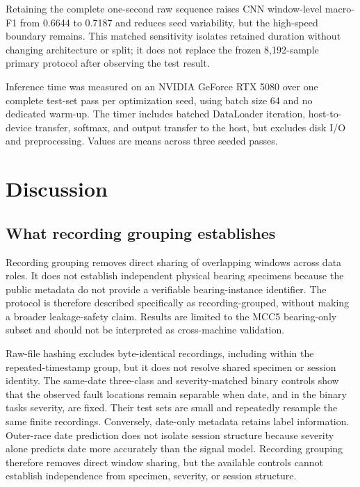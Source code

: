 \documentclass[11pt]{article}
\begin{document}
Retaining the complete one-second raw sequence raises CNN window-level macro-F1 from 0.6644 to 0.7187 and reduces seed variability, but the high-speed boundary remains. This matched sensitivity isolates retained duration without changing architecture or split; it does not replace the frozen 8,192-sample primary protocol after observing the test result.


\begin{table}[H]
\centering
\caption{Matched raw-CNN input-length sensitivity on the 3000-rpm holdout.}
\label{tab:length}
\small
{}
\vspace{0.3em}\parbox{\textwidth}{\footnotesize Inference time was measured on an NVIDIA GeForce RTX 5080 over one complete test-set pass per optimization seed, using batch size 64 and no dedicated warm-up. The timer includes batched DataLoader iteration, host-to-device transfer, softmax, and output transfer to the host, but excludes disk I/O and preprocessing. Values are means across three seeded passes.}
\end{table}


\section{Discussion}
\subsection{What recording grouping establishes}
Recording grouping removes direct sharing of overlapping windows across data roles. It does not establish independent physical bearing specimens because the public metadata do not provide a verifiable bearing-instance identifier. The protocol is therefore described specifically as recording-grouped, without making a broader leakage-safety claim. Results are limited to the MCC5 bearing-only subset and should not be interpreted as cross-machine validation.

Raw-file hashing excludes byte-identical recordings, including within the repeated-timestamp group, but it does not resolve shared specimen or session identity. The same-date three-class and severity-matched binary controls show that the observed fault locations remain separable when date, and in the binary tasks severity, are fixed. Their test sets are small and repeatedly resample the same finite recordings. Conversely, date-only metadata retains label information. Outer-race date prediction does not isolate session structure because severity alone predicts date more accurately than the signal model. Recording grouping therefore removes direct window sharing, but the available controls cannot establish independence from specimen, severity, or session structure.
\end{document}
